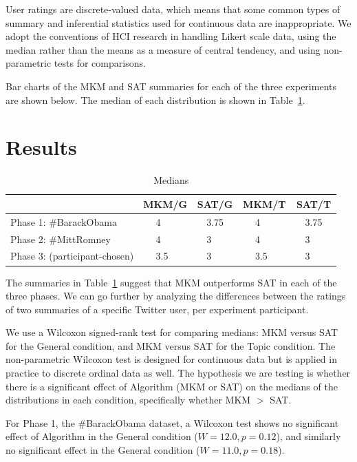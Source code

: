 User ratings are discrete-valued data, which means that some common
types of summary and inferential statistics used for continuous data
are inappropriate.  We adopt the conventions of HCI research in
handling Likert scale data, using the median rather than the means as
a measure of central tendency, and using non-parametric tests for
comparisons.

Bar charts of the MKM and SAT summaries for each of the three
experiments are shown below.  The median of each distribution is shown
in Table~\ref{tab:modes}.

\section{Results}

\begin{table}
\begin{center}
\begin{tabular}{|l|llllll|llllll|}
\hline
& \multicolumn{3}{c}{MKM\slash G} & \multicolumn{3}{c|}{SAT\slash G} & \multicolumn{3}{|c}{MKM\slash T} & \multicolumn{3}{c|}{SAT\slash T} \\
\hline
Phase 1: \#BarackObama      & & 4    & & & 3.75 & & & 4 & & & 3.75 & \\
Phase 2: \#MittRomney       & & 4    & & & 3    & & & 4 & & & 3  & \\
Phase 3: (participant-chosen) & & 3.5  & & & 3    & & & 3.5 & & & 3  & \\
\hline
\end{tabular}
\end{center}
\caption{Medians}
\label{tab:modes}
\end{table}

The summaries in Table~\ref{tab:modes} suggest that MKM outperforms
SAT in each of the three phases.  We can go further by analyzing
the differences between the ratings of two summaries of a specific
Twitter user, per experiment participant.  

We use a Wilcoxon signed-rank test for comparing medians: MKM versus
SAT for the General condition, and MKM versus SAT for the Topic
condition.  The non-parametric Wilcoxon test is designed for
continuous data but is applied in practice to discrete ordinal data as
well.  The hypothesis we are testing is whether there is a significant
effect of Algorithm (MKM or SAT) on the medians of the distributions
in each condition, specifically whether MKM $>$ SAT.

For Phase 1, the \#BarackObama dataset, a Wilcoxon test shows no
significant effect of Algorithm in the General condition ($W = 12.0, p
= 0.12$), and similarly no significant effect in the General condition
($W = 11.0, p = 0.18$).

